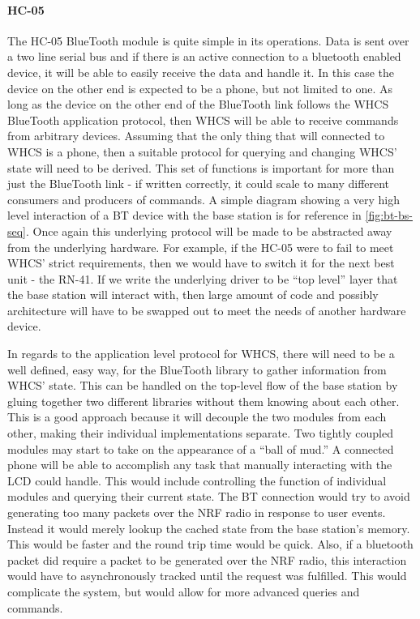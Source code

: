 \paragraph{HC-05}
The HC-05 BlueTooth module is quite simple in its operations. Data is sent over
a two line serial bus and if there is an active connection to a bluetooth
enabled device, it will be able to easily receive the data and handle it. In
this case the device on the other end is expected to be a phone, but not
limited to one. As long as the device on the other end of the BlueTooth link
follows the WHCS BlueTooth application protocol, then WHCS will be able to
receive commands from arbitrary devices. Assuming that the only thing that will
connected to WHCS is a phone, then a suitable protocol for querying and
changing WHCS' state will need to be derived. This set of functions is
important for more than just the BlueTooth link - if written correctly, it
could scale to many different consumers and producers of commands. A simple
diagram showing a very high level interaction of a BT device with the base
station is for reference in \autoref{fig:bt-bs-seq}. Once again
this underlying protocol will be made to be abstracted away from the underlying
hardware. For example, if the HC-05 were to fail to meet WHCS' strict
requirements, then we would have to switch it for the next best unit - the
RN-41. If we write the underlying driver to be ``top level'' layer that the
base station will interact with, then large amount of code and possibly
architecture will have to be swapped out to meet the needs of another hardware
device.


In regards to the application level protocol for WHCS, there will need to be a
well defined, easy way, for the BlueTooth library to gather information from
WHCS' state. This can be handled on the top-level flow of the base station by
gluing together two different libraries without them knowing about each other.
This is a good approach because it will decouple the two modules from each
other, making their individual implementations separate. Two tightly coupled
modules may start to take on the appearance of a ``ball of mud.'' A connected
phone will be able to accomplish any task that manually interacting with the
LCD could handle. This would include controlling the function of individual
modules and querying their current state. The BT connection would try to avoid
generating too many packets over the NRF radio in response to user events.
Instead it would merely lookup the cached state from the base station's memory.
This would be faster and the round trip time would be quick. Also, if a
bluetooth packet did require a packet to be generated over the NRF radio, this
interaction would have to asynchronously tracked until the request was
fulfilled. This would complicate the system, but would allow for more advanced
queries and commands.

